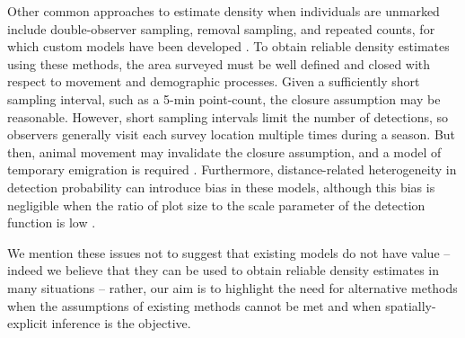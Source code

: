 Other common approaches to estimate density when individuals are
unmarked include double-observer sampling, removal sampling, and
repeated counts, for which custom models have been developed
\citep{nichols_etal:2000, farnsworth_etal:2002, royle:2004biom,
  royle:2004abc, nichols_etal:2009,fiske_chandler:2011}. To
obtain reliable density estimates using these
methods, the area surveyed must be well defined and closed with
respect to movement and demographic processes. Given a sufficiently short
sampling interval, such as a 5-min point-count, the closure
assumption may be reasonable. However, short sampling intervals limit
the number of detections, so observers generally visit each survey
location multiple times during a season. But then, animal
movement may invalidate the closure assumption, and a model of
temporary emigration is required
\citep{kendall_etal:1997,chandler_etal:2011}. Furthermore,
distance-related heterogeneity in detection probability can introduce
bias in these models, although this bias is negligible when the
ratio of plot size to the scale parameter of the detection function is low
\citep{efford_dawson:2009}.

We mention these issues not to suggest that existing models do not
have value -- indeed we believe that they can be used to obtain
reliable density estimates in many situations -- rather, our aim is to
highlight the need for alternative methods when the assumptions of
existing methods cannot be met and when spatially-explicit inference
is the objective. %



